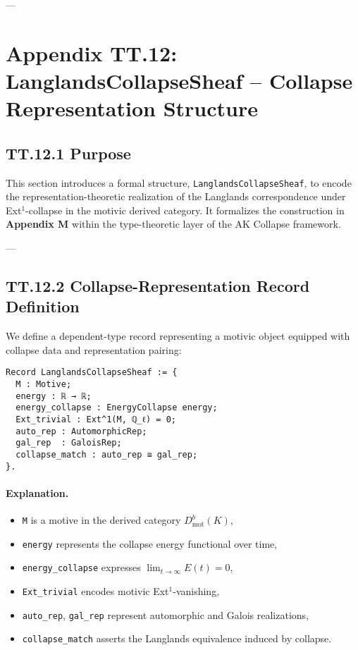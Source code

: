 \documentclass[11pt]{article}
\begin{document}
{---

\section*{Appendix TT.12: LanglandsCollapseSheaf – Collapse Representation Structure}

\subsection*{TT.12.1 Purpose}

This section introduces a formal structure, \texttt{LanglandsCollapseSheaf},  
to encode the representation-theoretic realization of the Langlands correspondence  
under Ext$^1$-collapse in the motivic derived category.  
It formalizes the construction in \textbf{Appendix M} within the type-theoretic layer of the AK Collapse framework.

---

\subsection*{TT.12.2 Collapse-Representation Record Definition}

We define a dependent-type record representing a motivic object equipped with collapse data and representation pairing:

\begin{verbatim}
Record LanglandsCollapseSheaf := {
  M : Motive;
  energy : ℝ → ℝ;
  energy_collapse : EnergyCollapse energy;
  Ext_trivial : Ext^1(M, ℚ_ℓ) = 0;
  auto_rep : AutomorphicRep;
  gal_rep  : GaloisRep;
  collapse_match : auto_rep ≅ gal_rep;
}.
\end{verbatim}

\paragraph{Explanation.}
\begin{itemize}
  \item \texttt{M} is a motive in the derived category \( D^b_{\mathrm{mot}}(K) \),
  \item \texttt{energy} represents the collapse energy functional over time,
  \item \texttt{energy\_collapse} expresses \( \lim_{t \to \infty} E(t) = 0 \),
  \item \texttt{Ext\_trivial} encodes motivic Ext$^1$-vanishing,
  \item \texttt{auto\_rep}, \texttt{gal\_rep} represent automorphic and Galois realizations,
  \item \texttt{collapse\_match} asserts the Langlands equivalence induced by collapse.
\end{itemize}

}
\end{document}
